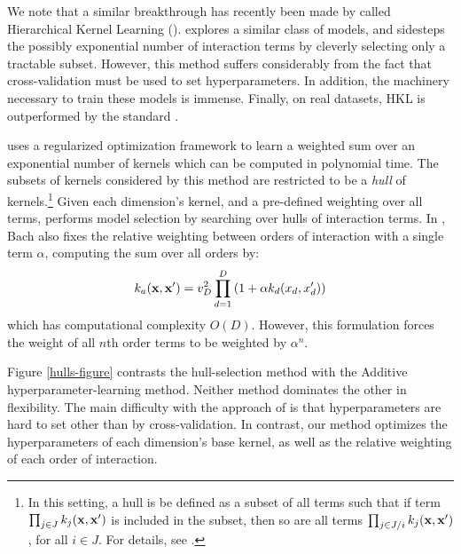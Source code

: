 We note that a similar breakthrough has recently been made by \citet{DBLP:journals/corr/abs-0909-0844} called Hierarchical Kernel Learning (\HKL{}).
\HKL{} explores a similar class of models, and sidesteps the possibly exponential number of interaction terms by cleverly selecting only a tractable subset.
However, this method suffers considerably from the fact that cross-validation must be used to set hyperparameters.
In addition, the machinery necessary to train these models is immense.
Finally, on real datasets, HKL is outperformed by the standard \SEGP{} \citep{DBLP:journals/corr/abs-0909-0844}.

\citet{DBLP:journals/corr/abs-0909-0844} uses a regularized optimization framework to learn a weighted sum over an exponential number of kernels which can be computed in polynomial time.
The subsets of kernels considered by this method are restricted to be a \textit{hull} of kernels.\footnote{In this setting, a hull is be defined as a subset of all terms such that if term $\prod_{j \in J} k_j(\bf x, x')$ is included in the subset, then so are all terms $\prod_{j \in J / i} k_j(\bf x, x')$, for all $i \in J$.
For details, see \citep{DBLP:journals/corr/abs-0909-0844}.}
Given each dimension's kernel, and a pre-defined weighting over all terms, \HKL{} performs model selection by searching over hulls of interaction terms.
In \cite{DBLP:journals/corr/abs-0909-0844}, Bach also fixes the relative weighting between orders of interaction with a single term $\alpha$, computing the sum over all orders by:
\begin{equation}
\label{eqn:uniform}
k_{a}({\bf x, x'}) = v_D^2 \prod_{d=1}^D \left(1 + \alpha k_{d}(x_{d}, x_{d}') \right)
\end{equation}
which has computational complexity $O(D)$.  However, this formulation forces the weight of all $n$th order terms to be weighted by $\alpha^n$.

Figure \ref{hulls-figure} contrasts the \HKL{} hull-selection method with the Additive \gp{} hyperparameter-learning method. Neither method dominates the other in flexibility.
The main difficulty with the approach of \cite{DBLP:journals/corr/abs-0909-0844} is that hyperparameters are hard to set other than by cross-validation.
In contrast, our method optimizes the hyperparameters of each dimension's base kernel, as well as the relative weighting of each order of interaction. 


